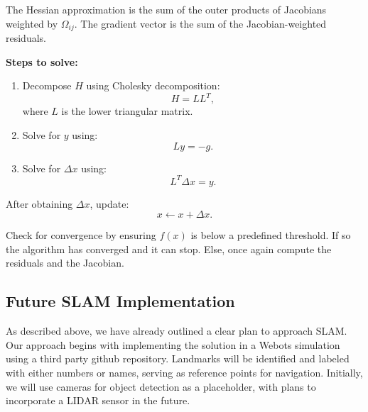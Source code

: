 \documentclass{article}
\begin{document}
\begin{enumerate}
    The Hessian approximation is the sum of the outer products of Jacobians weighted by $\Omega_{ij}$. The gradient vector is the sum of the Jacobian-weighted residuals.

    \textbf{Steps to solve:}
    \begin{enumerate}
        \item Decompose $H$ using Cholesky decomposition:
        \[
        H = L L^T,
        \]
        where $L$ is the lower triangular matrix.
        \item Solve for $y$ using:
        \[
        L y = -g.
        \]
        \item Solve for $\Delta x$ using:
        \[
        L^T \Delta x = y.
        \]
    \end{enumerate}

    After obtaining $\Delta x$, update:
    \[
    x \leftarrow x + \Delta x.
    \]

    Check for convergence by ensuring $f(x)$ is below a predefined threshold. If so the algorithm has converged and it can stop.
    Else, once again compute the residuals and the Jacobian.
    \subsection*{Future SLAM Implementation}
    As described above, we have already outlined a clear plan to approach SLAM. Our approach begins with implementing the solution in a Webots simulation using a third party github repository. Landmarks will be identified and labeled with either numbers or names, serving as reference points for navigation. Initially, we will use cameras for object detection as a placeholder, with plans to incorporate a LIDAR sensor in the future.
\end{enumerate}
\end{document}
